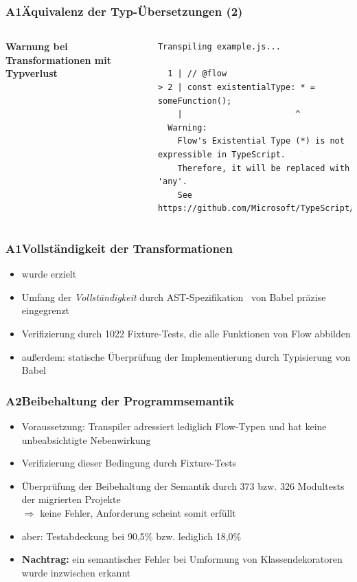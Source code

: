       \begin{frame}[fragile]
        \frametitle{A1\hspace{0.75em}Äquivalenz der Typ-Übersetzungen (2)}
        \begin{columns}
          \column{\dimexpr\paperwidth-16mm}
          \textbf{Warnung bei Transformationen mit Typverlust}
          \vspace{1.5em}
          \begin{lstlisting}[emph={Warning},numbers=none]
Transpiling example.js...

  1 | // @flow
> 2 | const existentialType: * = someFunction();
    |                       ^
  Warning:
    Flow's Existential Type (*) is not expressible in TypeScript.
    Therefore, it will be replaced with 'any'.
    See https://github.com/Microsoft/TypeScript/issues/14466.
            \end{lstlisting}
        \end{columns}

      \end{frame}

      \begin{frame}
        \frametitle{A1\hspace{0.75em}Vollständigkeit der Transformationen}
        \begin{itemize}
          \item wurde erzielt
          \item Umfang der \textit{Vollständigkeit} durch AST-Spezifikation~\autocite{BABEL:PARSER_SPEC} von Babel präzise eingegrenzt
          \item Verifizierung durch 1022 Fixture-Tests, die alle Funktionen von Flow abbilden
          \item außerdem: statische Überprüfung der Implementierung durch Typisierung von Babel
        \end{itemize}
      \end{frame}

      \begin{frame}
        \frametitle{A2\hspace{0.75em}Beibehaltung der Programmsemantik}
          \begin{itemize}
            \item Voraussetzung: Transpiler adressiert lediglich Flow-Typen und hat keine unbeabsichtigte Nebenwirkung
            \item Verifizierung dieser Bedingung durch Fixture-Tests
            \item Überprüfung der Beibehaltung der Semantik durch 373 bzw. 326 Modultests der migrierten Projekte\\
              \smallskip
              $\Rightarrow$ keine Fehler, Anforderung scheint somit erfüllt
            \item aber: Testabdeckung bei 90,5\% bzw. lediglich 18,0\%
            \item \textbf{Nachtrag:} ein semantischer Fehler bei Umformung von Klassendekoratoren wurde inzwischen erkannt
          \end{itemize}
      \end{frame}

